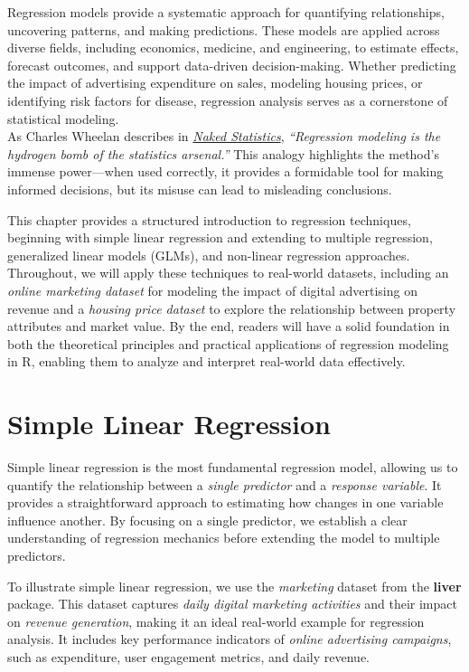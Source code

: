 \documentclass[
  11pt,
]{book}
\theoremstyle{definition}
\theoremstyle{definition}
\theoremstyle{definition}
\theoremstyle{definition}
\theoremstyle{remark}
\begin{document}
Regression models provide a systematic approach for quantifying relationships, uncovering patterns, and making predictions. These models are applied across diverse fields, including economics, medicine, and engineering, to estimate effects, forecast outcomes, and support data-driven decision-making. Whether predicting the impact of advertising expenditure on sales, modeling housing prices, or identifying risk factors for disease, regression analysis serves as a cornerstone of statistical modeling.\\
As Charles Wheelan describes in \href{https://www.goodreads.com/book/show/15786586-naked-statistics}{\emph{Naked Statistics}}\citep{wheelan2013naked}, \emph{``Regression modeling is the hydrogen bomb of the statistics arsenal.''} This analogy highlights the method's immense power---when used correctly, it provides a formidable tool for making informed decisions, but its misuse can lead to misleading conclusions.

This chapter provides a structured introduction to regression techniques, beginning with simple linear regression and extending to multiple regression, generalized linear models (GLMs), and non-linear regression approaches. Throughout, we will apply these techniques to real-world datasets, including an \emph{online marketing dataset} for modeling the impact of digital advertising on revenue and a \emph{housing price dataset} to explore the relationship between property attributes and market value. By the end, readers will have a solid foundation in both the theoretical principles and practical applications of regression modeling in R, enabling them to analyze and interpret real-world data effectively.

\section{Simple Linear Regression}\label{sec-simple-regression}

Simple linear regression is the most fundamental regression model, allowing us to quantify the relationship between a \emph{single predictor} and a \emph{response variable}. It provides a straightforward approach to estimating how changes in one variable influence another. By focusing on a single predictor, we establish a clear understanding of regression mechanics before extending the model to multiple predictors.

To illustrate simple linear regression, we use the \emph{marketing} dataset from the \textbf{liver} package. This dataset captures \emph{daily digital marketing activities} and their impact on \emph{revenue generation}, making it an ideal real-world example for regression analysis. It includes key performance indicators of \emph{online advertising campaigns}, such as expenditure, user engagement metrics, and daily revenue.
\end{document}
